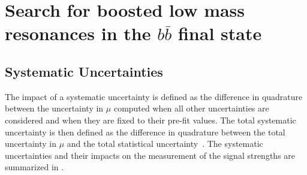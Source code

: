 \chapter{Search for boosted low mass resonances in the $b\bar{b}$ final state}\label{chapter:analysis}

\section{Systematic Uncertainties}\label{sec:systematic_uncertainties}

The impact of a systematic uncertainty is defined as the difference in quadrature between the uncertainty in $\mu$ computed when all other uncertainties are considered and when they are fixed to their pre-fit values.
The total systematic uncertainty is then defined as the difference in quadrature between the total uncertainty in $\mu$ and the total statistical uncertainty~\cite{ATLAS-CONF-2018-052}.
The systematic uncertainties and their impacts on the measurement of the signal strengths are summarized in .

